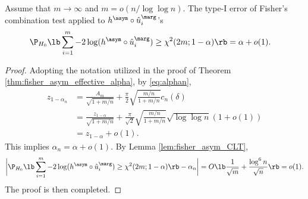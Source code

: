 \begin{thm}\label{thm:fisher_asym_effective_alpha_decay}
  Assume that $m \rightarrow \infty$ and $m = o(n / \log \log n)$. The type-I error of Fisher's combination test applied to $h^\asym\circ \hat{u}_i^\marg$'s
  \begin{align*}
    &\P_{H_0}\lb\sum_{i=1}^{m} -2\log(h^\asym \circ \hat{u}_i^\marg)\ge \chi^2(2m; 1 - \alpha)\rb = \alpha + o(1).
  \end{align*}
\end{thm}
\begin{proof}
  Adopting the notation utilized in the proof of Theorem \ref{thm:fisher_asym_effective_alpha}, by \eqref{eq:alphan},
  \begin{align*}
    z_{1 - \alpha_{n}} &= \frac{A_{m}}{\sqrt{1 + m/n}} + \frac{\pi}{2}\sqrt{\frac{m/n}{1 + m/n}}c_{n}(\delta)\\
                       & = \frac{z_{1-\alpha}}{\sqrt{1+m/n}} + \frac{\pi}{\sqrt{2}}\sqrt{\frac{m/n}{1 + m/n}}\sqrt{\log\log n}(1 + o(1))\\
    & = z_{1- \alpha} + o(1).
  \end{align*}
  This implies $\alpha_{n} = \alpha + o(1)$. By Lemma \ref{lem:fisher_asym_CLT},
  \[\bigg|\P_{H_0}\lb\sum_{i=1}^{m} -2\log(h^\asym \circ \hat{u}_i^\marg)\ge \chi^2(2m; 1 - \alpha)\rb - \alpha_n\bigg| = O\lb \frac{1}{\sqrt{m}} + \frac{\log^6 n}{\sqrt{n}}\rb = o(1).\]
  The proof is then completed.
\end{proof}

